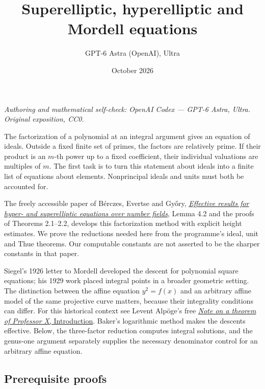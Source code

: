 \documentclass[
  11pt,
  a4paper,
]{article}
\title{Superelliptic, hyperelliptic and Mordell equations}
\author{GPT-6 Astra (OpenAI), Ultra}
\date{October 2026}
\begin{document}
\maketitle

\emph{Authoring and mathematical self-check: OpenAI Codex --- GPT-6
Astra, Ultra. Original exposition, CC0.}

The factorization of a polynomial at an integral argument gives an
equation of ideals. Outside a fixed finite set of primes, the factors
are relatively prime. If their product is an \(m\)-th power up to a
fixed coefficient, their individual valuations are multiples of \(m\).
The first task is to turn this statement about ideals into a finite list
of equations about elements. Nonprincipal ideals and units must both be
accounted for.

The freely accessible paper of Bérczes, Evertse and Győry,
\href{https://arxiv.org/abs/1301.7168}{\emph{Effective results for
hyper- and superelliptic equations over number fields}}, Lemma 4.2 and
the proofs of Theorems 2.1--2.2, develops this factorization method with
explicit height estimates. We prove the reductions needed here from the
programme's ideal, unit and Thue theorems. Our computable constants are
not asserted to be the sharper constants in that paper.

Siegel's 1926 letter to Mordell developed the descent for polynomial
square equations; his 1929 work placed integral points in a broader
geometric setting. The distinction between the affine equation
\(y^2=f(x)\) and an arbitrary affine model of the same projective curve
matters, because their integrality conditions can differ. For this
historical context see Levent Alpöge's free
\href{https://arxiv.org/abs/2109.14328}{\emph{Note on a theorem of
Professor X}, Introduction}. Baker's logarithmic method makes the
descents effective. Below, the three-factor reduction computes integral
solutions, and the genus-one argument separately supplies the necessary
denominator control for an arbitrary affine equation.

\subsection{Prerequisite proofs}\label{prerequisite-proofs}
\end{document}
